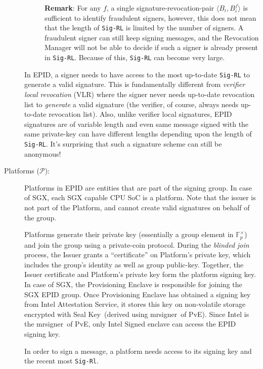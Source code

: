 \documentclass[letterpaper]{article}
\newcommand{\mrsigner}{\textsf{mrsigner}}
\newcommand{\pve}{\textsf{PvE}}
\newcommand{\sk}{\textsf{Seal Key}}
\begin{document}
\begin{description}
\begin{description}
        \textbf{Remark}: For any $f$, a single signature-revocation-pair $\langle B_i, B_i^f\rangle$ is sufficient to identify fraudulent signers, however, this does not mean that the length of \texttt{Sig-RL} is limited by the number of signers. A fraudulent signer can still keep signing messages, and the Revocation Manager will not be able to decide if such a signer is already present in \texttt{Sig-RL}. Because of this, \texttt{Sig-RL} can become very large.
    \end{description}

    In EPID, a signer needs to have access to the most up-to-date
    \texttt{Sig-RL} to generate a valid signature. This is
    fundamentally different from \textit{verifier local revocation}
    (VLR) \cite{BonehVLR} where the signer never needs up-to-date
    revocation list to \textit{generate} a valid signature (the verifier, of course, always needs up-to-date revocation list). Also, unlike verifier local signatures, EPID signatures are of variable length
    and even same message signed with the same private-key can have
    different lengths depending upon the length of
    \texttt{Sig-RL}. It's surprising that such a signature scheme can
    still be anonymous!

    \item[Platforms ($\mathcal{P}$):] Platforms in EPID are entities
      that are part of the signing group. In case of SGX, each SGX
      capable CPU SoC is a platform. Note that the issuer is not part
      of the Platform, and cannot create valid signatures on behalf of
      the group.

      Platforms generate their private key (essentially a group
      element in $\mathbb{F}_p^{\times}$) and join the group using a private-coin
      protocol. During the \textit{blinded join} process, the Issuer
      grants a ``certificate'' on Platform's private key, which
      includes the group's identity as well as group
      public-key. Together, the Issuer certificate and Platform's
      private key form the platform signing key. In case of SGX, the
      \textsf{Provisioning Enclave} is responsible for joining the SGX
      EPID group. Once \textsf{Provisioning Enclave} has obtained a
      signing key from Intel Attestation Service, it stores this key
      on non-volatile storage encrypted with \sk\ (derived 
      using \mrsigner\ of \pve). Since Intel is the
      \mrsigner\ of \pve, only Intel Signed enclave can access the
      EPID signing key.

      In order to sign a message, a platform needs access to its
      signing key and the recent most \texttt{Sig-Rl}.


\end{description}
\end{document}
